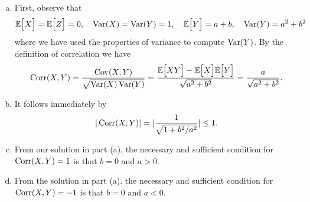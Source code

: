 \begin{solution}
	\begin{enumerate}[(a)]
		\item First, observe that 
		\[ \mathbb{E}\big[X\big] = \mathbb{E}\big[Z\big] = 0, \quad \operatorname{Var}(X) = \operatorname{Var}(Y) = 1, \quad \mathbb{E}\big[Y\big] = a+b, \quad \operatorname{Var}(Y) = a^2 + b^2 \]
		where we have used the properties of variance to compute $ \operatorname{Var}(Y) $. By the definition of correlation we have
		\[ \operatorname{Corr}(X,Y) = \frac{\operatorname{Cov}(X,Y)}{\sqrt{\operatorname{Var}(X)\operatorname{Var}(Y)}} = \frac{\mathbb{E}\big[XY\big] - \mathbb{E}\big[X\big]\mathbb{E}\big[Y\big]}{\sqrt{a^2+b^2}} = \frac{a}{\sqrt{a^2+b^2}}. \]
		
		\item It follows immediately by
		\[ |\operatorname{Corr}(X,Y)| = |\frac{1}{\sqrt{1+b^2/a^2}}| \leq 1. \]
		
		\item From our solution in part (a), the necessary and sufficient condition for $ \operatorname{Corr}(X,Y) = 1 $ is that $ b = 0 $ and $ a> 0 $.
		
		\item From the solution in part (a). the necessary and sufficient condition for $ \operatorname{Corr}(X,Y) = -1 $ is that $ b = 0 $ and $ a < 0 $.
	\end{enumerate}
	
\end{solution}

